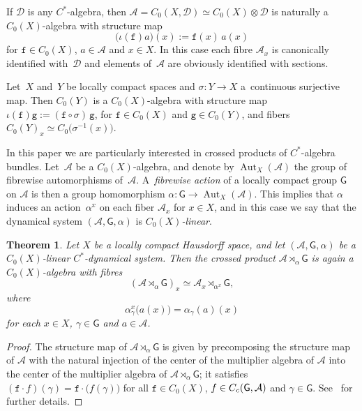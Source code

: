 \documentclass[11pt]{article}
\numberwithin{equation}{section}
\numberwithin{equation}{section}
\newcommand{\Dcal}{\mathcal{D}}
\newcommand{\sfG}{\mathsf{G}}
\newcommand{\Aut}{\operatorname{Aut}}
\def\alg{{\mathcal A}}
\newtheorem{Theorem}{Theorem}[section]
\begin{document}
\begin{Example}
If $\Dcal$ is any $C^*$-algebra, then $\alg=C_0(X,\Dcal)\simeq
C_0(X)\otimes\Dcal$ is naturally a $C_0(X)$-algebra with structure map
\[
\big(\iota(\mathtt{f})a\big)(x) := \mathtt{f}(x)\,a(x)
\]
for $\mathtt{f}\in C_0(X)$, $a\in\alg$ and $x\in X$. In this case each fibre
$\alg_x$ is canonically identified with~$\Dcal$ and elements of~$\alg$
are obviously identified with sections.
\end{Example}

\begin{Example}\label{ex:ctsmaps}
Let~$X$ and~$Y$ be locally compact spaces and $\sigma\colon Y\to X$ a~continuous surjective map. Then $C_0(Y)$ is a $C_0(X)$-algebra with structure map
$\iota(\mathtt{f})\mathtt{g}:=(\mathtt{f}\circ\sigma)\,\mathtt{g}$, for $\mathtt{f}\in C_0(X)$ and $\mathtt{g}\in C_0(Y)$,
and fibers $C_0(Y)_x\simeq C_0\big(\sigma^{-1}(x)\big)$.
\end{Example}

In this paper we are particularly interested in crossed
products of $C^*$-algebra bundles. Let~$\alg$ be a $C_0(X)$-algebra,
and denote by $\Aut_X(\alg)$ the group of {fibrewise
automorphisms} of~$\alg$. A~\emph{fibrewise action} of a locally compact group $\sfG$ on
$\alg$ is then a group homomorphism $\alpha\colon \sfG\to\Aut_X(\alg)$. This
implies that $\alpha$ induces an action~$\alpha^x$ on each fiber
$\alg_x$ for $x\in X$, and in
this case we say that the dynamical system $(\alg,\sfG,\alpha)$ is
\emph{$C_0(X)$-linear}.

\begin{Theorem}\label{thm:crossedfibres}
Let $X$ be a locally compact Hausdorff space, and let
$(\alg,\sfG,\alpha)$ be a $C_0(X)$-linear $C^*$-dynamical system. Then
the crossed product $\alg\rtimes_\alpha\sfG$ is again a
$C_0(X)$-algebra with fibres
\[
(\alg\rtimes_\alpha\sfG)_x\simeq\alg_x\rtimes_{\alpha^x}\sfG ,
\]
where
\[
\alpha_\gamma^x\big(a(x)\big) = \alpha_\gamma(a)(x)
\]
for each $x\in X$, $\gamma\in\sfG$ and $a\in\alg$.
\end{Theorem}

\begin{proof}The structure map
of $\alg\rtimes_\alpha\sfG$ is given by precomposing the structure map
of $\alg$ with the natural injection of the center of the multiplier
algebra of $\alg$ into the center of the multiplier algebra of
$\alg\rtimes_\alpha\sfG$; it satisfies
$(\mathtt{f}\cdot f)(\gamma)=\mathtt{f}\cdot\big(f(\gamma)\big)$ for all
$\mathtt{f}\in C_0(X)$, $f\in C_{\rm c}(\sfG,\alg)$ and
$\gamma\in\sfG$. See~\cite[Theorem~8.4]{Williams2007} for further
details.
\end{proof}
\end{document}
